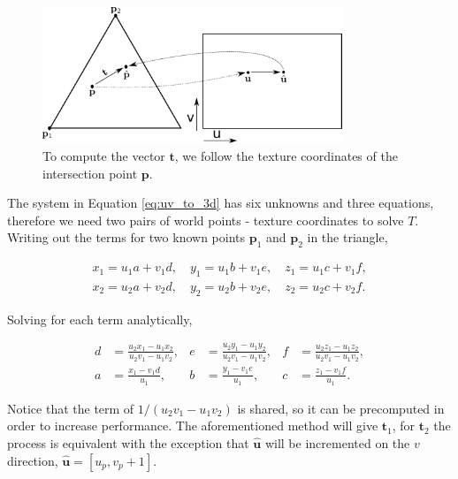 \documentclass[12pt]{article}
\newcommand{\tb}{\mathbf{t}}
\begin{document}
\begin{figure}[htbp!]
\centering
\includegraphics[width=0.8\textwidth]{images/thread_3d_coord}
	\caption{To compute the vector $\tb$, we follow the texture coordinates of the intersection point $\mathbf{p}$.}
	\label{fig:thread_uv_coord}
\end{figure}

The system in Equation \ref{eq:uv_to_3d} has six unknowns and three equations, therefore we need two pairs of world points - texture coordinates to solve $T$.
Writing out the terms for two known points $\mathbf{p}_1$ and $\mathbf{p}_2$ in the triangle,

\begin{equation}
\begin{split}
x_1 = u_1 a + v_1 d, \quad y_1 = u_1 b + v_1 e, \quad z_1 = u_1 c + v_1 f,\\
x_2 = u_2 a + v_2 d, \quad y_2 = u_2 b + v_2 e, \quad z_2 = u_2 c + v_2 f.
\end{split}
\end{equation}

Solving for each term analytically,

\begin{align}
d& = \frac{u_2 x_1 - u_1 x_2}{u_2 v_1 - u_1 v_2},& e& = \frac{u_2 y_1 - u_1 y_2}{u_2 v_1 - u_1 v_2},& f& = \frac{u_2 z_1 - u_1 z_2}{u_2 v_1 - u_1 v_2}, \\
a& = \frac{x_1 - v_1 d}{u_1},& b& = \frac{y_1 - v_1 e}{u_1},&  c& = \frac{z_1 - v_1 f}{u_1}.
\end{align}

Notice that the term of $1/(u_2 v_1 - u_1 v_2)$ is shared, so it can be precomputed in order to increase performance.
The aforementioned method will give $\tb_1$, for $\tb_2$ the process is equivalent with the exception that $\hat{\mathbf{u}}$ will be incremented on the $v$ direction, $\hat{\mathbf{u}} = \left[ u_p, v_p + 1\right]$.
\end{document}
